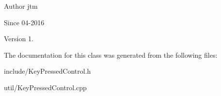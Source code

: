 \begin{DoxyAuthor}{Author}
jtm 
\end{DoxyAuthor}
\begin{DoxySince}{Since}
04-\/2016 
\end{DoxySince}
\begin{DoxyVersion}{Version}
1. 
\end{DoxyVersion}


The documentation for this class was generated from the following files\+:\begin{DoxyCompactItemize}
\item 
include/Key\+Pressed\+Control.\+h\item 
util/Key\+Pressed\+Control.\+cpp\end{DoxyCompactItemize}
